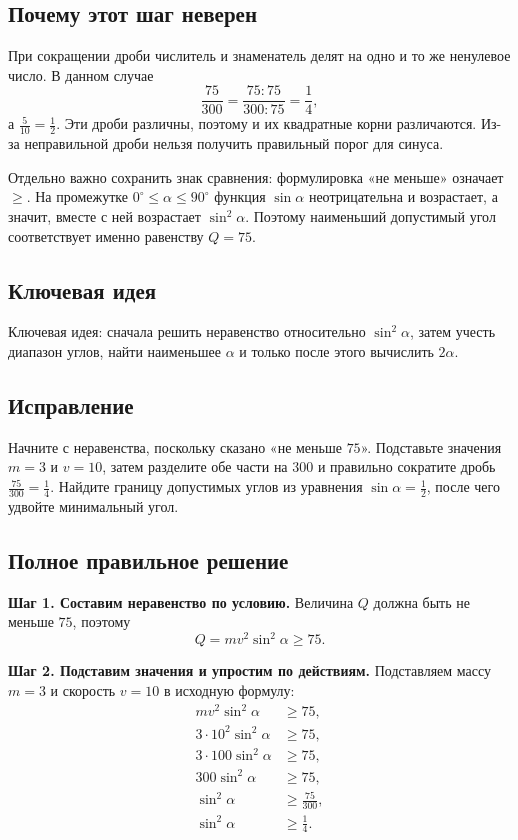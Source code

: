 \documentclass[12pt,a4paper]{article}
\begin{document}
\subsection*{Почему этот шаг неверен}
При сокращении дроби числитель и знаменатель делят на одно и то же ненулевое число. В данном случае
\[
\frac{75}{300}=\frac{75:75}{300:75}=\frac14,
\]
а $\frac5{10}=\frac12$. Эти дроби различны, поэтому и их квадратные корни различаются. Из-за неправильной дроби нельзя получить правильный порог для синуса.

Отдельно важно сохранить знак сравнения: формулировка «не меньше» означает $\ge$. На промежутке $0^\circ\le\alpha\le90^\circ$ функция $\sin\alpha$ неотрицательна и возрастает, а значит, вместе с ней возрастает $\sin^2\alpha$. Поэтому наименьший допустимый угол соответствует именно равенству $Q=75$.

\subsection*{Ключевая идея}
\textcolor{blue!60!black}{Ключевая идея:} сначала решить неравенство относительно $\sin^2\alpha$, затем учесть диапазон углов, найти наименьшее $\alpha$ и только после этого вычислить $2\alpha$.

\subsection*{Исправление}
Начните с неравенства, поскольку сказано «не меньше $75$». Подставьте значения $m=3$ и $v=10$, затем разделите обе части на $300$ и правильно сократите дробь $\frac{75}{300}=\frac14$. Найдите границу допустимых углов из уравнения $\sin\alpha=\frac12$, после чего удвойте минимальный угол.

\subsection*{Полное правильное решение}
\textbf{Шаг 1. Составим неравенство по условию.}
Величина $Q$ должна быть не меньше $75$, поэтому
\[
Q=mv^2\sin^2\alpha\ge75.
\]

\textbf{Шаг 2. Подставим значения и упростим по действиям.}
Подставляем массу $m=3$ и скорость $v=10$ в исходную формулу:
\begin{align*}
mv^2\sin^2\alpha&\ge75,\\
3\cdot10^2\sin^2\alpha&\ge75,\\
3\cdot100\sin^2\alpha&\ge75,\\
300\sin^2\alpha&\ge75,\\
\sin^2\alpha&\ge\frac{75}{300},\\
\sin^2\alpha&\ge\frac14.
\end{align*}
\end{document}

